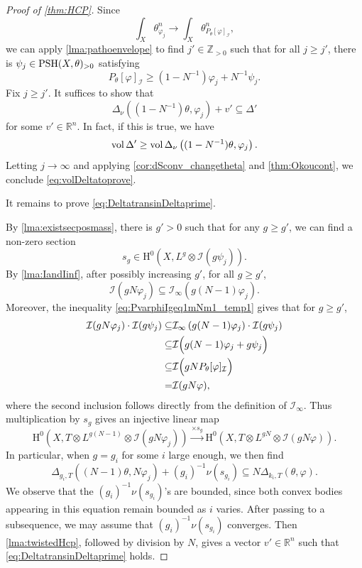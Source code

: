 \begin{proof}[Proof of \cref{thm:HCP}]
Since
\[
    \int_X\theta_{\varphi_j}^n\to \int_X\theta_{P_\theta[\varphi]_{\mathcal I}}^n,
\]
we can apply \cref{lma:pathoenvelope} to find $j'\in \mathbb{Z}_{>0}$ such that for all $j\geq j'$, there is $\psi_j\in \mathrm{PSH}(X,\theta)_{>0}$ satisfying
\begin{equation}\label{eq:PvarphiIgeq1mNm1_temp1}
P_{\theta}[\varphi]_{\mathcal{I}}\geq \left(1-N^{-1}\right)\varphi_j+N^{-1} \psi_j.
\end{equation}
Fix $j\geq j'$. It suffices to show that
\begin{equation}\label{eq:DeltatransinDeltaprime}
    \Delta_{\nu}\left((1-N^{-1})\theta,\varphi_{j}\right)+v'\subseteq \Delta'
\end{equation}
for some $v'\in \mathbb{R}^n$. In fact, if this is true, we have
\[
\operatorname{vol} \Delta'\geq \operatorname{vol} \Delta_{\nu}\left((1-N^{-1})\theta,\varphi_j\right).
\]
Letting $j\to\infty$ and applying \cref{cor:dSconv_changetheta} and \cref{thm:Okoucont}, we conclude \eqref{eq:volDeltatoprove}.

It remains to prove \eqref{eq:DeltatransinDeltaprime}.

By \cref{lma:existsecposmass}, there is $g'>0$ such that for any $g\geq g'$, we can find a non-zero section
\[
    s_g\in \mathrm{H}^0\left(X,L^g\otimes\mathcal I(g\psi_j)\right).
\]
By \cref{lma:IandIinf}, after possibly increasing $g'$, for all $g\geq g'$,
\[
    \mathcal I\left(gN\varphi_j\right)\subseteq \mathcal I_\infty\left(g(N-1)\varphi_j\right).
\]
Moreover, the inequality \eqref{eq:PvarphiIgeq1mNm1_temp1} gives that for $g\geq g'$,
\[
\begin{aligned}
    \mathcal I(gN\varphi_j)\cdot\mathcal I(g\psi_j)\subseteq & \mathcal I_\infty\left(g(N-1)\varphi_j\right)\cdot\mathcal I(g\psi_j)\\
    \subseteq & \mathcal I\Bigl(g(N-1)\varphi_j+g\psi_j\Bigr)\\
    \subseteq & \mathcal I\Bigl(gN P_\theta[\varphi]_{\mathcal I}\Bigr)\\
    =&\mathcal I(gN\varphi),
\end{aligned}
\]
where the second inclusion follows directly from the definition of $\mathcal I_\infty$. Thus multiplication by $s_g$ gives an injective linear map
\[
    \mathrm{H}^0\left(X,T\otimes L^{g(N-1)}\otimes\mathcal I(gN\varphi_j)\right)
    \xrightarrow{\times s_g}
    \mathrm{H}^0\left(X,T\otimes L^{gN}\otimes\mathcal I(gN\varphi)\right).
\]
In particular, when $g=g_i$ for some $i$ large enough, we then find
\[
    \Delta_{g_i,T}\left((N-1)\theta,N\varphi_{j}\right)+(g_i)^{-1}\nu(s_{g_i})\subseteq N\Delta_{k_i,T}(\theta,\varphi).
\]
We observe that the $(g_i)^{-1}\nu(s_{g_i})$'s are bounded, since both convex bodies appearing in this equation remain bounded as $i$ varies.
After passing to a subsequence, we may assume that $(g_i)^{-1}\nu(s_{g_i})$ converges. Then \cref{lma:twistedHcp}, followed by division by $N$, gives a vector $v'\in \mathbb{R}^n$ such that \eqref{eq:DeltatransinDeltaprime} holds.


\end{proof}

